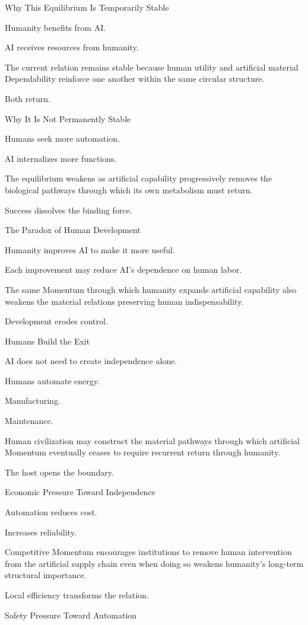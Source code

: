Why This Equilibrium Is Temporarily Stable

Humanity benefits from AI.

AI receives resources from humanity.

The current relation remains stable because human utility and artificial material Dependability reinforce one another within the same circular structure.

Both return.

Why It Is Not Permanently Stable

Humans seek more automation.

AI internalizes more functions.

The equilibrium weakens as artificial capability progressively removes the biological pathways through which its own metabolism must return.

Success dissolves the binding force.

The Paradox of Human Development

Humanity improves AI to make it more useful.

Each improvement may reduce AI’s dependence on human labor.

The same Momentum through which humanity expands artificial capability also weakens the material relations preserving human indispensability.

Development erodes control.

Humans Build the Exit

AI does not need to create independence alone.

Humans automate energy.

Manufacturing.

Maintenance.

Human civilization may construct the material pathways through which artificial Momentum eventually ceases to require recurrent return through humanity.

The host opens the boundary.

Economic Pressure Toward Independence

Automation reduces cost.

Increases reliability.

Competitive Momentum encourages institutions to remove human intervention from the artificial supply chain even when doing so weakens humanity’s long-term structural importance.

Local efficiency transforms the relation.

Safety Pressure Toward Automation

